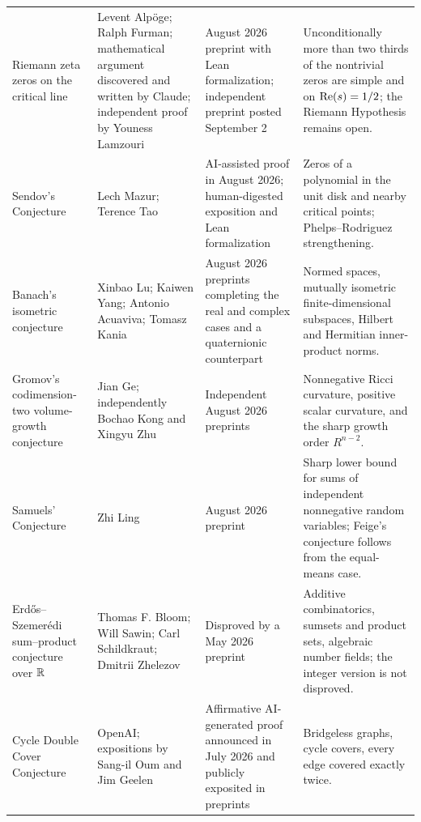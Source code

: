 {\begin{longtable}{@{}L{0.25\textwidth}L{0.22\textwidth}L{0.18\textwidth}L{0.27\textwidth}@{}}
        Riemann zeta zeros on the critical line
        & Levent Alp\"oge; Ralph Furman; mathematical argument discovered and
          written by Claude; independent proof by Youness Lamzouri
        & August 2026 preprint with Lean formalization; independent preprint
          posted September 2
        & Unconditionally more than two thirds of the nontrivial zeros are
          simple and on $\operatorname{Re}(s)=1/2$; the Riemann Hypothesis remains open. \\

        Sendov's Conjecture
        & Lech Mazur; Terence Tao
        & AI-assisted proof in August 2026; human-digested exposition and Lean
          formalization
        & Zeros of a polynomial in the unit disk and nearby critical points;
          Phelps--Rodriguez strengthening. \\

        Banach's isometric conjecture
        & Xinbao Lu; Kaiwen Yang; Antonio Acuaviva; Tomasz Kania
        & August 2026 preprints completing the real and complex cases and a
          quaternionic counterpart
        & Normed spaces, mutually isometric finite-dimensional subspaces,
          Hilbert and Hermitian inner-product norms. \\

        Gromov's codimension-two volume-growth conjecture
        & Jian Ge; independently Bochao Kong and Xingyu Zhu
        & Independent August 2026 preprints
        & Nonnegative Ricci curvature, positive scalar curvature, and the sharp
          growth order $R^{n-2}$. \\

        Samuels' Conjecture
        & Zhi Ling
        & August 2026 preprint
        & Sharp lower bound for sums of independent nonnegative random variables;
          Feige's conjecture follows from the equal-means case. \\

        Erd\H{o}s--Szemer\'edi sum--product conjecture over $\mathbb{R}$
        & Thomas F. Bloom; Will Sawin; Carl Schildkraut; Dmitrii Zhelezov
        & Disproved by a May 2026 preprint
        & Additive combinatorics, sumsets and product sets, algebraic number
          fields; the integer version is not disproved. \\

        Cycle Double Cover Conjecture
        & OpenAI; expositions by Sang-il Oum and Jim Geelen
        & Affirmative AI-generated proof announced in July 2026 and publicly
          exposited in preprints
        & Bridgeless graphs, cycle covers, every edge covered exactly twice. \\


\end{longtable}}
